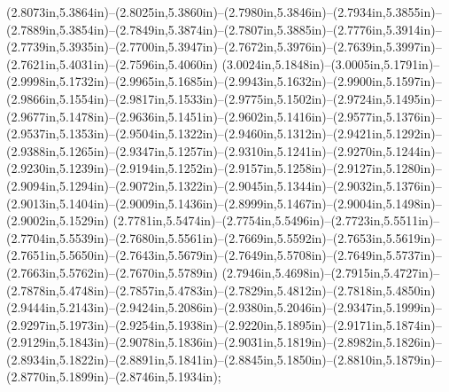 (2.8073in,5.3864in)--(2.8025in,5.3860in)--(2.7980in,5.3846in)--(2.7934in,5.3855in)--(2.7889in,5.3854in)--(2.7849in,5.3874in)--(2.7807in,5.3885in)--(2.7776in,5.3914in)--(2.7739in,5.3935in)--(2.7700in,5.3947in)--(2.7672in,5.3976in)--(2.7639in,5.3997in)--(2.7621in,5.4031in)--(2.7596in,5.4060in) (3.0024in,5.1848in)--(3.0005in,5.1791in)--(2.9998in,5.1732in)--(2.9965in,5.1685in)--(2.9943in,5.1632in)--(2.9900in,5.1597in)--(2.9866in,5.1554in)--(2.9817in,5.1533in)--(2.9775in,5.1502in)--(2.9724in,5.1495in)--(2.9677in,5.1478in)--(2.9636in,5.1451in)--(2.9602in,5.1416in)--(2.9577in,5.1376in)--(2.9537in,5.1353in)--(2.9504in,5.1322in)--(2.9460in,5.1312in)--(2.9421in,5.1292in)--(2.9388in,5.1265in)--(2.9347in,5.1257in)--(2.9310in,5.1241in)--(2.9270in,5.1244in)--(2.9230in,5.1239in)--(2.9194in,5.1252in)--(2.9157in,5.1258in)--(2.9127in,5.1280in)--(2.9094in,5.1294in)--(2.9072in,5.1322in)--(2.9045in,5.1344in)--(2.9032in,5.1376in)--(2.9013in,5.1404in)--(2.9009in,5.1436in)--(2.8999in,5.1467in)--(2.9004in,5.1498in)--(2.9002in,5.1529in) (2.7781in,5.5474in)--(2.7754in,5.5496in)--(2.7723in,5.5511in)--(2.7704in,5.5539in)--(2.7680in,5.5561in)--(2.7669in,5.5592in)--(2.7653in,5.5619in)--(2.7651in,5.5650in)--(2.7643in,5.5679in)--(2.7649in,5.5708in)--(2.7649in,5.5737in)--(2.7663in,5.5762in)--(2.7670in,5.5789in) (2.7946in,5.4698in)--(2.7915in,5.4727in)--(2.7878in,5.4748in)--(2.7857in,5.4783in)--(2.7829in,5.4812in)--(2.7818in,5.4850in)
(2.9444in,5.2143in)--(2.9424in,5.2086in)--(2.9380in,5.2046in)--(2.9347in,5.1999in)--(2.9297in,5.1973in)--(2.9254in,5.1938in)--(2.9220in,5.1895in)--(2.9171in,5.1874in)--(2.9129in,5.1843in)--(2.9078in,5.1836in)--(2.9031in,5.1819in)--(2.8982in,5.1826in)--(2.8934in,5.1822in)--(2.8891in,5.1841in)--(2.8845in,5.1850in)--(2.8810in,5.1879in)--(2.8770in,5.1899in)--(2.8746in,5.1934in);
